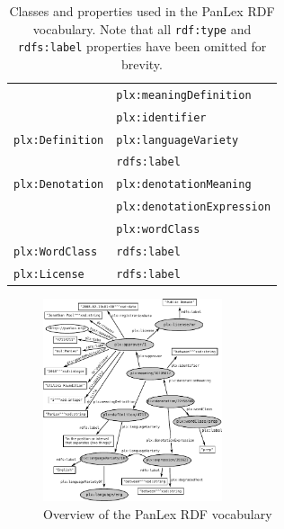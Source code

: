 \documentclass[sw]{iosart2c}
\begin{document}
\begin{table}
\begin{scriptsize}
\begin{tabular}{ll}
                      & \texttt{plx:meaningDefinition} \\
                      & \texttt{plx:identifier} \\
\midrule
\texttt{plx:Definition}
                      & \texttt{plx:languageVariety} \\
                      & \texttt{rdfs:label} \\
\midrule
\texttt{plx:Denotation}
                      & \texttt{plx:denotationMeaning} \\
                      & \texttt{plx:denotationExpression} \\
                      & \texttt{plx:wordClass} \\
\midrule
\texttt{plx:WordClass}  
                      & \texttt{rdfs:label} \\
\midrule
\texttt{plx:License}  & \texttt{rdfs:label} \\
\bottomrule
\end{tabular}
\end{scriptsize}
\caption{Classes and properties used in the PanLex RDF vocabulary. Note that all \texttt{rdf:type} and \texttt{rdfs:label} properties have been omitted for brevity.}
\label{tbl:vocabulary}
\end{table}

\begin{figure}
\includegraphics[width=0.47\textwidth]{images/pdf/ontology.pdf}
\caption{Overview of the PanLex RDF vocabulary}
\label{fig:vocabulary}
\end{figure}
\end{document}
